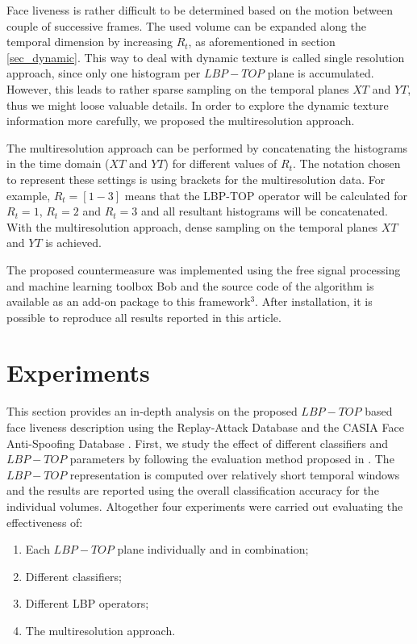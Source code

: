 Face liveness is rather difficult to be determined based on the motion between couple of successive frames. The used volume can be expanded along the temporal dimension by increasing $R_t$, as aforementioned in section \ref{sec_dynamic}. This way to deal with dynamic texture is called single resolution approach, since only one histogram per $LBP-TOP$ plane is accumulated. However, this leads to rather sparse sampling on the temporal planes $XT$ and $YT$, thus we might loose valuable details. In order to explore the dynamic texture information more carefully, we proposed the multiresolution approach.

The multiresolution approach can be performed by concatenating the histograms in the time domain ($XT$ and $YT$) for different values of $R_t$. The notation chosen to represent these settings is using brackets for the multiresolution data. For example, $R_t=[1-3]$ means that the LBP-TOP operator will be calculated for $R_t=1$, $R_t=2$ and $R_t=3$ and all resultant histograms will be concatenated. With the multiresolution approach, dense sampling on the temporal planes $XT$ and $YT$ is achieved.

The proposed countermeasure was implemented using the free signal processing and machine learning toolbox Bob \cite{AnjosIdiapRR252012} and the source code of the algorithm is available as an add-on package to this framework$^3$. After installation, it is possible to reproduce all results reported in this article.

\section{Experiments}
\label{sec_experiments}

This section provides an in-depth analysis on the proposed $LBP-TOP$ based face liveness description using the Replay-Attack Database \cite{ChingovskaBIOSIG2012} and the CASIA Face Anti-Spoofing Database \cite{zhangface}. First, we study the effect of different classifiers and $LBP-TOP$ parameters by following the evaluation method proposed in \cite{TiagoLBP2012}. The $LBP-TOP$ representation is computed over relatively short temporal windows and the results are reported using the overall classification accuracy for the individual volumes. Altogether four experiments were carried out evaluating the effectiveness of:

\begin{enumerate}
        \item Each $LBP-TOP$ plane individually and in combination;
        \item Different classifiers;
        \item Different LBP operators;
        \item The multiresolution approach.
\end{enumerate}

